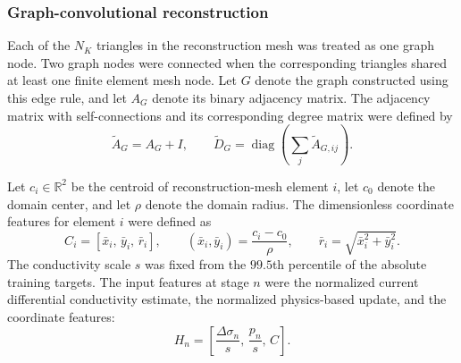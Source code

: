 \documentclass[11pt]{article}
\newcommand{\R}{\mathbb{R}}
\begin{document}
\subsubsection{Graph-convolutional reconstruction}

Each of the $N_K$ triangles in the reconstruction mesh was treated as one graph node.
Two graph nodes were connected when the corresponding triangles shared at least one finite element mesh node.
Let $G$ denote the graph constructed using this edge rule, and let $A_G$ denote its binary adjacency matrix.
The adjacency matrix with self-connections and its corresponding degree matrix were defined by
\begin{equation*}
    \widetilde A_G
    =
    A_G+I,
    \qquad
    \widetilde D_G
    =
    \operatorname{diag}\!\left(\sum_j \widetilde A_{G,ij}\right).
\end{equation*}

Let $c_i\in\R^2$ be the centroid of reconstruction-mesh element $i$, let $c_0$ denote the domain center, and let $\rho$ denote the domain radius.
The dimensionless coordinate features for element $i$ were defined as
\begin{equation*}
    C_i
    =
    \left[
        \bar x_i,\,
        \bar y_i,\,
        \bar r_i
    \right],
    \qquad
    (\bar x_i,\bar y_i)
    =
    \frac{c_i-c_0}{\rho},
    \qquad
    \bar r_i
    =
    \sqrt{\bar x_i^2+\bar y_i^2}.
\end{equation*}
The conductivity scale $s$ was fixed from the $99.5$th percentile of the absolute training targets.
The input features at stage $n$ were the normalized current differential conductivity estimate, the normalized physics-based update, and the coordinate features:
\begin{equation*}
    H_n
    =
    \left[
        \frac{\Delta\sigma_n}{s},\,
        \frac{p_n}{s},\,
        C
    \right].
\end{equation*}
\end{document}
